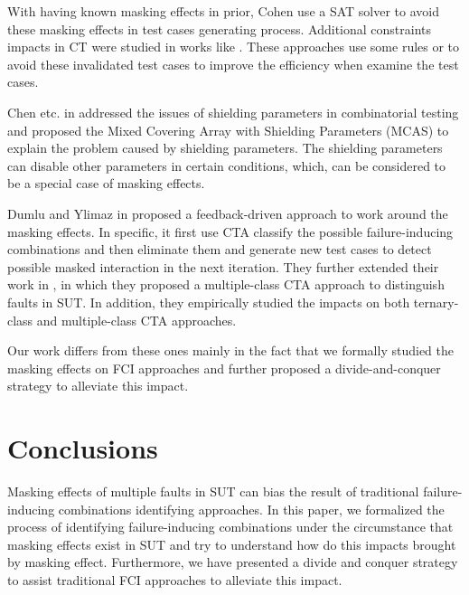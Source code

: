 \documentclass{sig-alternate}
\begin{document}
With having known masking effects in prior, Cohen \cite{cohen2008constructing} use a SAT solver to avoid these masking effects in test cases generating process. Additional constraints impacts in CT were studied in works like \cite{bryce2006prioritized,calvagna2008logic,grindal2006handling,yilmaz2013test}. These approaches use some rules or to avoid these invalidated test cases to improve the efficiency when examine the test cases.

Chen etc. in \cite{chen2010combinatorial} addressed the issues of shielding parameters in combinatorial testing  and proposed the Mixed Covering Array with Shielding Parameters (MCAS) to explain the problem caused by shielding parameters. The shielding parameters can disable other parameters in certain conditions, which, can be considered to be a special case of masking effects.

Dumlu and Ylimaz in \cite{dumlu2011feedback} proposed a feedback-driven approach to work around the masking effects. In specific, it first use CTA classify the possible failure-inducing combinations and then eliminate them and generate new test cases to detect possible masked interaction in the next iteration. They further extended their work in \cite{yilmaz2013reducing}, in which they proposed a multiple-class CTA approach to distinguish faults in SUT. In addition, they empirically studied the impacts on both ternary-class and multiple-class CTA approaches.

Our work differs from these ones mainly in the fact that we formally studied the masking effects on FCI approaches and further proposed a divide-and-conquer strategy to alleviate this impact.

\section{Conclusions}
Masking effects of multiple faults in SUT can bias the result of traditional failure-inducing combinations identifying approaches. In this paper, we formalized the process of identifying failure-inducing combinations under the circumstance that masking effects exist in SUT and try to understand how do this impacts brought by masking effect. Furthermore, we have presented a divide and conquer strategy to assist traditional FCI approaches to alleviate this impact.

\end{document}
